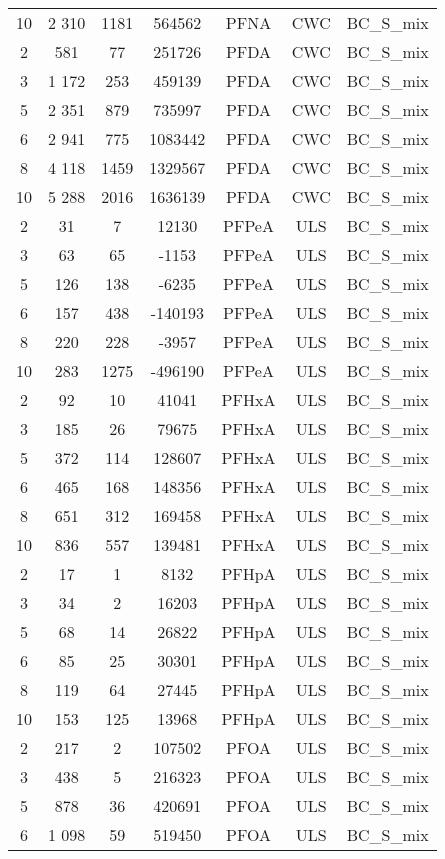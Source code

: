 \begin{longtable}[c]{ccccccc}
10 & 2 310 & 1181 & 564562 & PFNA & CWC & BC\_S\_mix \\
2 & 581 & 77 & 251726 & PFDA & CWC & BC\_S\_mix \\
3 & 1 172 & 253 & 459139 & PFDA & CWC & BC\_S\_mix \\
5 & 2 351 & 879 & 735997 & PFDA & CWC & BC\_S\_mix \\
6 & 2 941 & 775 & 1083442 & PFDA & CWC & BC\_S\_mix \\
8 & 4 118 & 1459 & 1329567 & PFDA & CWC & BC\_S\_mix \\
10 & 5 288 & 2016 & 1636139 & PFDA & CWC & BC\_S\_mix \\
2 & 31 & 7 & 12130 & PFPeA & ULS & BC\_S\_mix \\
3 & 63 & 65 & -1153 & PFPeA & ULS & BC\_S\_mix \\
5 & 126 & 138 & -6235 & PFPeA & ULS & BC\_S\_mix \\
6 & 157 & 438 & -140193 & PFPeA & ULS & BC\_S\_mix \\
8 & 220 & 228 & -3957 & PFPeA & ULS & BC\_S\_mix \\
10 & 283 & 1275 & -496190 & PFPeA & ULS & BC\_S\_mix \\
2 & 92 & 10 & 41041 & PFHxA & ULS & BC\_S\_mix \\
3 & 185 & 26 & 79675 & PFHxA & ULS & BC\_S\_mix \\
5 & 372 & 114 & 128607 & PFHxA & ULS & BC\_S\_mix \\
6 & 465 & 168 & 148356 & PFHxA & ULS & BC\_S\_mix \\
8 & 651 & 312 & 169458 & PFHxA & ULS & BC\_S\_mix \\
10 & 836 & 557 & 139481 & PFHxA & ULS & BC\_S\_mix \\
2 & 17 & 1 & 8132 & PFHpA & ULS & BC\_S\_mix \\
3 & 34 & 2 & 16203 & PFHpA & ULS & BC\_S\_mix \\
5 & 68 & 14 & 26822 & PFHpA & ULS & BC\_S\_mix \\
6 & 85 & 25 & 30301 & PFHpA & ULS & BC\_S\_mix \\
8 & 119 & 64 & 27445 & PFHpA & ULS & BC\_S\_mix \\
10 & 153 & 125 & 13968 & PFHpA & ULS & BC\_S\_mix \\
2 & 217 & 2 & 107502 & PFOA & ULS & BC\_S\_mix \\
3 & 438 & 5 & 216323 & PFOA & ULS & BC\_S\_mix \\
5 & 878 & 36 & 420691 & PFOA & ULS & BC\_S\_mix \\
6 & 1 098 & 59 & 519450 & PFOA & ULS & BC\_S\_mix \\

\end{longtable}

